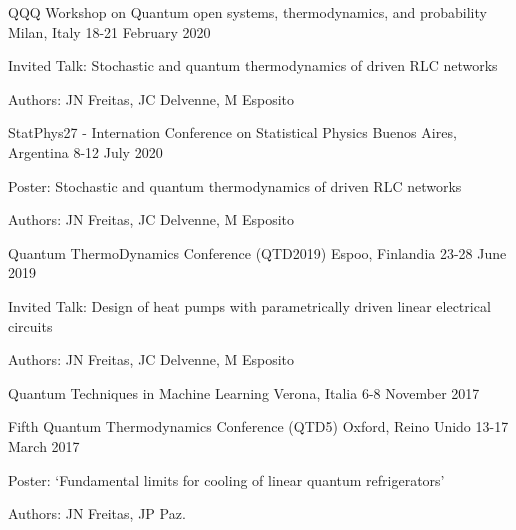 

\begin{confentries}

  \confentry
    {QQQ Workshop on Quantum open systems, thermodynamics, and probability}
    {Milan, Italy} %
    {18-21 February 2020} %
    {
    \begin{cvitems}
    \item Invited Talk: Stochastic and quantum thermodynamics of driven RLC networks
    \item Authors: JN Freitas, JC Delvenne, M Esposito
    \end{cvitems}
    }

  \confentry
    {StatPhys27 - Internation Conference on Statistical Physics}
    {Buenos Aires, Argentina} %
    {8-12 July 2020} %
    {
    \begin{cvitems}
    \item Poster: Stochastic and quantum thermodynamics of driven RLC networks
    \item Authors: JN Freitas, JC Delvenne, M Esposito
    \end{cvitems}
    }

  \confentry
    {Quantum ThermoDynamics Conference (QTD2019)} %
    {Espoo, Finlandia} %
    {23-28 June 2019} %
    {
    \begin{cvitems}
    \item Invited Talk: Design of heat pumps with parametrically driven linear
electrical circuits
    \item Authors: JN Freitas, JC Delvenne, M Esposito
    \end{cvitems}
    }

  \confentry
    {Quantum Techniques in Machine Learning} %
    {Verona, Italia} %
    {6-8 November 2017} %
    {
    }

  \confentry
    {Fifth Quantum Thermodynamics Conference (QTD5)} %
    {Oxford, Reino Unido} %
    {13-17 March 2017} %
    {
    \begin{cvitems}
    \item Poster: ‘Fundamental limits for cooling of linear quantum refrigerators’
    \item Authors: JN Freitas, JP Paz.
    \end{cvitems}
    }


\end{confentries}
